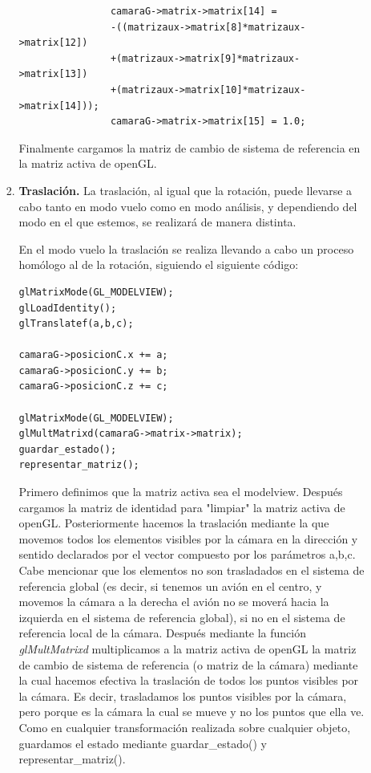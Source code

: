 \documentclass[12pt,a4paper]{article}
\begin{document}
\begin{enumerate}
\begin{enumerate}
\begin{enumerate}
\begin{lstlisting}
				camaraG->matrix->matrix[14] =
				-((matrizaux->matrix[8]*matrizaux->matrix[12])
				+(matrizaux->matrix[9]*matrizaux->matrix[13]) 
				+(matrizaux->matrix[10]*matrizaux->matrix[14]));
				camaraG->matrix->matrix[15] = 1.0;
\end{lstlisting}


Finalmente cargamos la matriz de cambio de sistema de referencia en la matriz activa de openGL.

\item \textbf{Traslación.}
La traslación, al igual que la rotación, puede llevarse a cabo tanto en modo vuelo como en modo análisis, y dependiendo del modo en el que estemos, se realizará de manera distinta.\newline

En el modo vuelo la traslación se realiza llevando a cabo un proceso homólogo al de la rotación, siguiendo el siguiente código:

\begin{lstlisting}
glMatrixMode(GL_MODELVIEW);
glLoadIdentity();
glTranslatef(a,b,c);

camaraG->posicionC.x += a;
camaraG->posicionC.y += b;
camaraG->posicionC.z += c;

glMatrixMode(GL_MODELVIEW);
glMultMatrixd(camaraG->matrix->matrix);
guardar_estado();
representar_matriz();
\end{lstlisting}
Primero definimos que la matriz activa sea el modelview. Después cargamos la matriz de identidad para "limpiar" la matriz activa de openGL. Posteriormente hacemos la traslación mediante la que movemos todos los elementos visibles por la cámara en la dirección y sentido declarados por el vector compuesto por los parámetros a,b,c. Cabe mencionar que los elementos no son trasladados en el sistema de referencia global (es decir, si tenemos un avión en el centro, y movemos la cámara a la derecha el avión no se moverá hacia la izquierda en el sistema de referencia global), si no en el sistema de referencia local de la cámara.\newline
Después mediante la función \textit{glMultMatrixd} multiplicamos a la matriz activa de openGL la matriz de cambio de sistema de referencia (o matriz de la cámara) mediante la cual hacemos efectiva la traslación de todos los puntos visibles por la cámara. Es decir, trasladamos los puntos visibles por la cámara, pero porque es la cámara la cual se mueve y no los puntos que ella ve.\newline
Como en cualquier transformación realizada sobre cualquier objeto, guardamos el estado mediante guardar\_estado() y representar\_matriz().
\newline


\end{enumerate}
\end{enumerate}
\end{enumerate}
\end{document}
